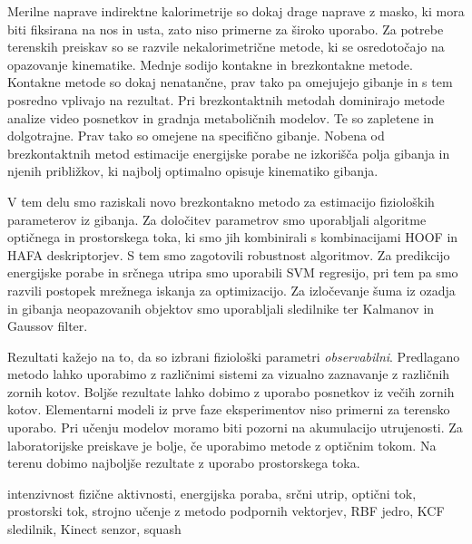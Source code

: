 \povzetek
Merilne naprave indirektne kalorimetrije so dokaj drage naprave z masko, ki mora biti fiksirana na nos in usta, zato niso primerne za široko uporabo. Za potrebe terenskih preiskav so se razvile nekalorimetrične metode, ki se osredotočajo na opazovanje kinematike. Mednje sodijo kontakne in brezkontakne metode. Kontakne metode so dokaj nenatančne, prav tako pa omejujejo gibanje in s tem posredno vplivajo na rezultat. Pri brezkontaktnih metodah dominirajo metode analize video posnetkov in gradnja metaboličnih modelov. Te so zapletene in dolgotrajne. Prav tako so omejene na specifično gibanje. Nobena od brezkontaktnih metod estimacije energijske porabe ne izkorišča polja gibanja in njenih približkov, ki najbolj optimalno opisuje kinematiko gibanja.

V tem delu smo raziskali novo brezkontakno metodo za estimacijo fizioloških parameterov iz gibanja. Za določitev parametrov smo uporabljali algoritme optičnega in prostorskega toka, ki smo jih kombinirali s kombinacijami HOOF in HAFA deskriptorjev. S tem smo zagotovili robustnost algoritmov. Za predikcijo energijske porabe in srčnega utripa smo uporabili SVM regresijo, pri tem pa smo razvili \nurbf postopek mrežnega iskanja za optimizacijo. Za izločevanje šuma iz ozadja in gibanja neopazovanih objektov smo uporabljali sledilnike ter Kalmanov in Gaussov filter.

Rezultati kažejo na to, da so izbrani fiziološki parametri \emph{observabilni}. Predlagano metodo lahko uporabimo z različnimi sistemi za vizualno zaznavanje z različnih zornih kotov. Boljše rezultate lahko dobimo z uporabo posnetkov iz večih zornih kotov. Elementarni modeli iz prve faze eksperimentov niso primerni za terensko uporabo. Pri učenju modelov moramo biti pozorni na akumulacijo utrujenosti. Za laboratorijske preiskave je bolje, če uporabimo metode z optičnim tokom. Na terenu dobimo najboljše rezultate z uporabo prostorskega toka.


\kljucnebesede intenzivnost fizične aktivnosti, energijska poraba, srčni utrip, optični tok, prostorski tok, strojno učenje z metodo podpornih vektorjev, RBF jedro, KCF sledilnik, Kinect senzor, squash